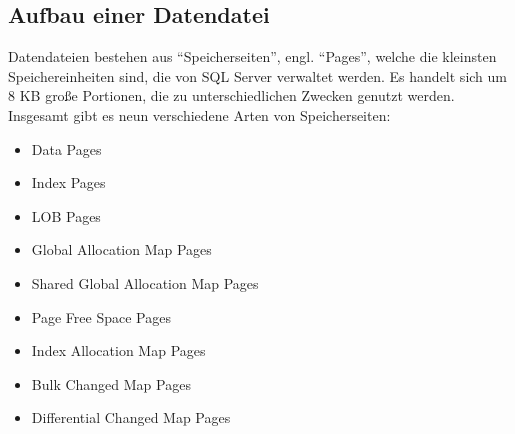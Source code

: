       \subsection{Aufbau einer Datendatei}
        Datendateien bestehen aus \enquote{Speicherseiten}, engl.
        \enquote{Pages}, welche die kleinsten Speichereinheiten sind, die
        von SQL Server verwaltet werden. Es handelt sich um 8 KB große
        Portionen, die zu unterschiedlichen Zwecken genutzt werden. Insgesamt gibt es neun
        verschiedene Arten von Speicherseiten:
\clearpage
        \begin{itemize}
          \item Data Pages
          \item Index Pages
          \item LOB Pages
          \item Global Allocation Map Pages
          \item Shared Global Allocation Map Pages
          \item Page Free Space Pages
          \item Index Allocation Map Pages
          \item Bulk Changed Map Pages
          \item Differential Changed Map Pages
        \end{itemize}
